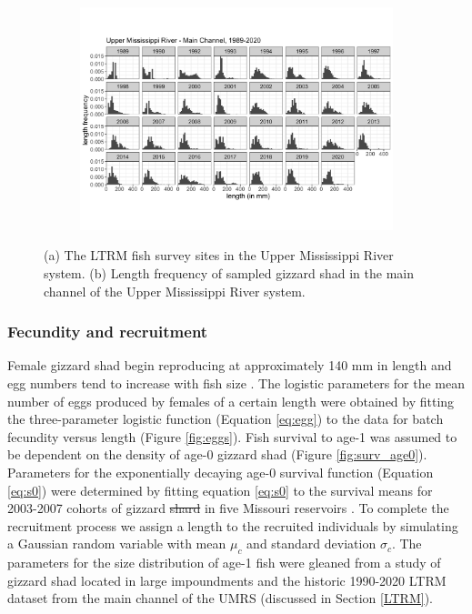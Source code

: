 \documentclass[preprint,review,12pt,authoryear]{elsarticle}
\providecommand{\DIFaddtex}[1]{{\protect\color{blue}\uwave{#1}}} %
\providecommand{\DIFdeltex}[1]{{\protect\color{red}\sout{#1}}}                      %
\providecommand{\DIFaddbegin}{} %
\providecommand{\DIFaddend}{} %
\providecommand{\DIFdelbegin}{} %
\providecommand{\DIFdelend}{} %
\providecommand{\DIFaddendFL}{} %
\providecommand{\DIFadd}[1]{\texorpdfstring{\DIFaddtex{#1}}{#1}} %
\providecommand{\DIFdel}[1]{\texorpdfstring{\DIFdeltex{#1}}{}} %
\begin{document}
\begin{figure}
\begin{subfigure}[b]{.68\textwidth}
   \includegraphics[width=\textwidth]{figures/LTRMmain.png}
   \DIFaddendFL \caption{}
   \label{fig:LTRMmain}
\end{subfigure}
\caption{(a) The LTRM fish survey sites in the Upper Mississippi River system. (b) Length frequency of sampled gizzard shad in the main channel of the Upper Mississippi River system.}
\end{figure}    

\subsubsection{Fecundity and recruitment}
Female gizzard shad begin reproducing at approximately 140 mm in length and egg numbers tend to increase with fish size \citep{jons1997ovarian}. 
The logistic parameters for the mean number of eggs produced by females of a certain length were obtained by fitting the three-parameter logistic function (Equation \ref{eq:egg}) to the data for batch fecundity versus length \citep{jons1997ovarian} (Figure \ref{fig:eggs}). 
Fish survival to age-1 was assumed to be dependent on the density of age-0 gizzard shad (Figure \ref{fig:surv_age0}).  
Parameters for the exponentially decaying age-0 survival function (Equation \ref{eq:s0}) were determined by fitting equation \ref{eq:s0} to the survival means for 2003-2007 cohorts of gizzard \DIFdelbegin \DIFdel{shard }\DIFdelend \DIFaddbegin \DIFadd{shad }\DIFaddend in five Missouri reservoirs \citep{michaletz2010overwinter}.
To complete the recruitment process we assign a length to the recruited individuals by simulating a Gaussian random variable with mean \DIFdelbegin \DIFdel{$\mu_c$ }\DIFdelend \DIFaddbegin \DIFadd{$\mu_r$ }\DIFaddend and standard deviation \DIFdelbegin \DIFdel{$\sigma_c$}\DIFdelend \DIFaddbegin \DIFadd{$\sigma_r$}\DIFaddend .
The parameters for the size distribution of age-1 fish were gleaned from a study of gizzard shad located in large impoundments \citep{michaletz2017variation} and the historic 1990-2020 LTRM dataset from the main channel of the UMRS (discussed in Section \ref{LTRM}).
\end{document}
